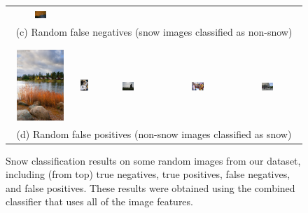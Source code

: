 \begin{figure}[th]
{{\begin{center}
\begin{tabular}{@{}c@{\,\,\,}c@{\,\,\,}c@{\,\,\,}c@{\,\,\,}c@{\,\,\,}}
\includegraphics[width=0.19\textwidth]{figs/fp9.jpg} \\
\multicolumn{5}{c}{(c) Random false negatives (snow images classified as non-snow)} \\ 
\\[-6pt]
\hline
\\[-6pt]
\includegraphics[height=1.05in]{figs/fn2.jpg} &
\includegraphics[height=1.05in]{figs/fn4.jpg} &
\includegraphics[width=0.19\textwidth]{figs/fn5.jpg} &
\includegraphics[width=0.19\textwidth]{figs/fn7.jpg} &
\includegraphics[width=0.19\textwidth]{figs/fn8.jpg} \\
\multicolumn{5}{c}{(d) Random false positives (non-snow images classified as snow)} \\
\end{tabular}
\end{center}
}}
\caption{Snow classification results on some random images from our dataset, including (from top) true negatives, true positives, false negatives, and false positives.
These results were obtained using the combined classifier that uses all of the image features.}
\label{fig:fp}
\end{figure}



